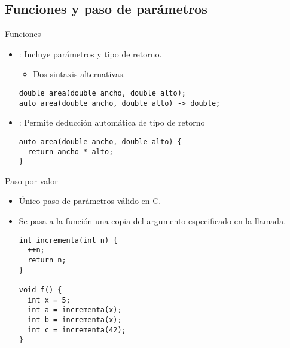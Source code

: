 \subsection{Funciones y paso de parámetros}

\begin{frame}[t,fragile]{Funciones}
\begin{itemize}
  \item {}: Incluye parámetros y tipo de retorno.
    \begin{itemize}
      \item Dos sintaxis alternativas.
    \end{itemize}
\begin{lstlisting}
double area(double ancho, double alto);
auto area(double ancho, double alto) -> double;
\end{lstlisting}

  \vfill
  \item {}: Permite deducción automática de tipo de retorno
\begin{lstlisting}
auto area(double ancho, double alto) {
  return ancho * alto;
}
\end{lstlisting}
\end{itemize}
\end{frame}

\begin{frame}[t,fragile]{Paso por valor}
\begin{itemize}
  \item Único paso de parámetros válido en C.
  \item Se pasa a la función una copia del argumento especificado en la llamada.
\begin{lstlisting}
int incrementa(int n) {
  ++n;
  return n;
}

void f() {
  int x = 5;
  int a = incrementa(x);
  int b = incrementa(x);
  int c = incrementa(42);
}
\end{lstlisting}
\end{itemize}
\end{frame}

